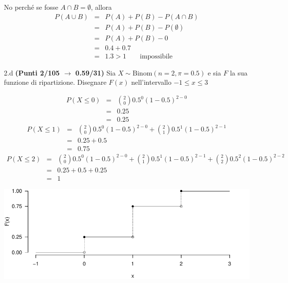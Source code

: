 \documentclass[
  11pt,
]{book}
\theoremstyle{mytheoremstyle}
\theoremstyle{mydefstyle}
\newenvironment{sol}
  {
  \begin{tcolorbox}[enhanced,breakable,arc=0.1mm,boxrule=1pt,colback=white,colframe=iblue,
  title=\bf \fontfamily{lmss}\selectfont \hspace{.5 cm} Soluzione,drop fuzzy shadow]

}{
\end{tcolorbox}
  }
\begin{document}
\begin{sol}
No perché se fosse \(A\cap B=\emptyset\), allora
\begin{eqnarray*}
P(A \cup B)    &=&  P(A) + P(B) - P(A\cap B)\\
               &=&  P(A) + P(B) - P(\emptyset)\\
               &=&  P(A) + P(B) - 0 \\
               &=&  0.4 + 0.7\\
               &=& 1.3 > 1 \qquad\text{impossibile}
\end{eqnarray*}

\end{sol}

2.d \textbf{(Punti 2/105 \(\rightarrow\) 0.59/31)} Sia \(X\sim\text{Binom}(n=2,\pi=0.5)\) e sia \(F\) la sua funzione di ripartizione. Disegnare \(F(x)\) nell'intervallo \(-1\leq x\leq 3\)

\begin{sol}

\normalsize 
\begin{eqnarray*}
      P( X \leq 0 ) &=& \binom{ 2 }{ 0 } 0.5 ^{ 0 }(1- 0.5 )^{ 2 - 0 } \\                 &=& 0.25 \\                 &=& 0.25 
   \end{eqnarray*}
\normalsize  \normalsize 
\begin{eqnarray*}
      P( X \leq 1 ) &=& \binom{ 2 }{ 0 } 0.5 ^{ 0 }(1- 0.5 )^{ 2 - 0 }+\binom{ 2 }{ 1 } 0.5 ^{ 1 }(1- 0.5 )^{ 2 - 1 } \\                 &=& 0.25+0.5 \\                 &=& 0.75 
   \end{eqnarray*}
\normalsize  \normalsize 
\begin{eqnarray*}
      P( X \leq 2 ) &=& \binom{ 2 }{ 0 } 0.5 ^{ 0 }(1- 0.5 )^{ 2 - 0 }+\binom{ 2 }{ 1 } 0.5 ^{ 1 }(1- 0.5 )^{ 2 - 1 }+\binom{ 2 }{ 2 } 0.5 ^{ 2 }(1- 0.5 )^{ 2 - 2 } \\                 &=& 0.25+0.5+0.25 \\                 &=& 1 
   \end{eqnarray*}
\normalsize 

\begin{center}\includegraphics{Esami_passati_con_soluzioni_files/figure-latex/2024-97-1} \end{center}

\end{sol}
\end{document}
